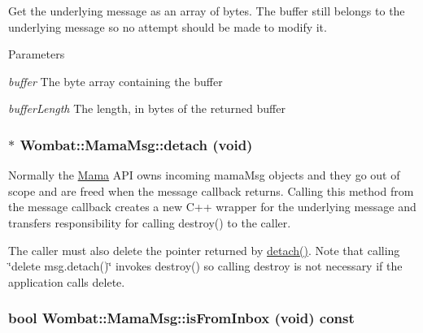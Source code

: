 Get the underlying message as an array of bytes. The buffer still belongs to the underlying message so no attempt should be made to modify it.


\begin{DoxyParams}{Parameters}
\item[{\em buffer}]The byte array containing the buffer \item[{\em bufferLength}]The length, in bytes of the returned buffer \end{DoxyParams}
\hypertarget{classWombat_1_1MamaMsg_a31dfd297630ab77abc3d8474c9a432c1}{
\subsubsection[{detach}]{$\ast$ Wombat::MamaMsg::detach (void)}}
\label{classWombat_1_1MamaMsg_a31dfd297630ab77abc3d8474c9a432c1}


Normally the \hyperlink{classWombat_1_1Mama}{Mama} API owns incoming mamaMsg objects and they go out of scope and are freed when the message callback returns. Calling this method from the message callback creates a new C++ wrapper for the underlying message and transfers responsibility for calling destroy() to the caller.

The caller must also delete the pointer returned by \hyperlink{classWombat_1_1MamaMsg_a31dfd297630ab77abc3d8474c9a432c1}{detach()}. Note that calling \char`\"{}delete msg.detach()\char`\"{} invokes destroy() so calling destroy is not necessary if the application calls delete. \hypertarget{classWombat_1_1MamaMsg_a3383cf94e958375db86531667e5c32c9}{
\subsubsection[{isFromInbox}]{\setlength{\rightskip}{0pt plus 5cm}bool Wombat::MamaMsg::isFromInbox (void) const}}
\label{classWombat_1_1MamaMsg_a3383cf94e958375db86531667e5c32c9}


